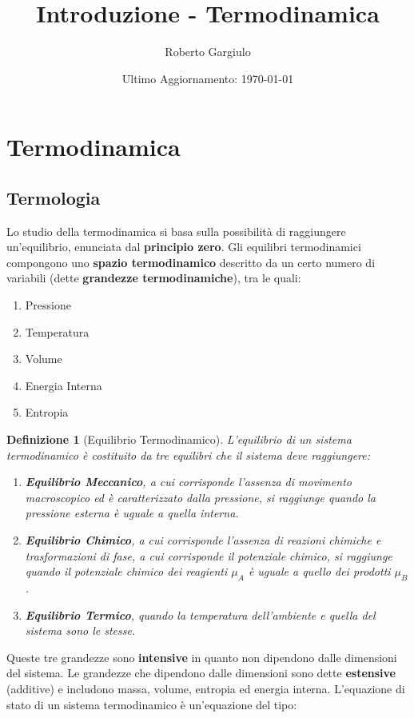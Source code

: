 \documentclass{article}
\title{Introduzione - Termodinamica}
\author{Roberto Gargiulo}
\date{Ultimo Aggiornamento: \today}
\newtheorem{defn}{Definizione}[section]
\begin{document}
\maketitle
\tableofcontents


\section{Termodinamica}
\subsection{Termologia}
Lo studio della termodinamica si basa sulla possibilità di raggiungere un'equilibrio, enunciata dal \textbf{principio zero}. Gli equilibri termodinamici compongono uno \textbf{spazio termodinamico} descritto da un certo numero di variabili (dette \textbf{grandezze termodinamiche}), tra le quali:
\begin{enumerate}
    \item Pressione
    \item Temperatura
    \item Volume
    \item Energia Interna
    \item Entropia
\end{enumerate}
\begin{defn}[Equilibrio Termodinamico]
L'equilibrio di un sistema termodinamico è costituito da tre equilibri che il sistema deve raggiungere:
\begin{enumerate}
    \item \textbf{Equilibrio Meccanico}, a cui corrisponde l'assenza di movimento macroscopico ed è caratterizzato dalla pressione, si raggiunge quando la pressione esterna è uguale a quella interna.
    \item \textbf{Equilibrio Chimico}, a cui corrisponde l'assenza di reazioni chimiche e trasformazioni di fase, a cui corrisponde il potenziale chimico, si raggiunge quando il potenziale chimico dei reagienti $\mu_A$ è uguale a quello dei prodotti $\mu_B$.
    \item \textbf{Equilibrio Termico}, quando la temperatura dell'ambiente e quella del sistema sono le stesse.
\end{enumerate}
\end{defn}
Queste tre grandezze sono \textbf{intensive} in quanto non dipendono dalle dimensioni del sistema. Le grandezze che dipendono dalle dimensioni sono dette \textbf{estensive} (additive) e includono massa, volume, entropia ed energia interna.
L'equazione di stato di un sistema termodinamico è un'equazione del tipo:
\end{document}
